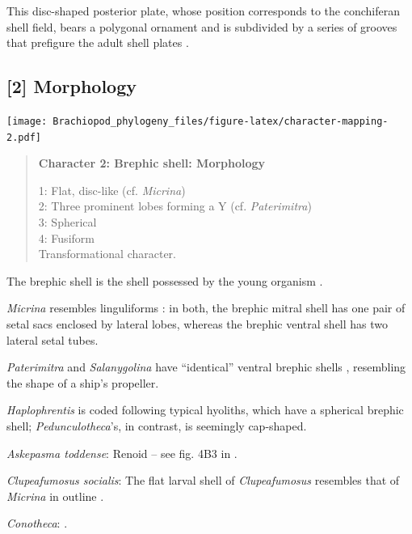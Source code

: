 \documentclass[openany]{book}
\begin{document}
This disc-shaped posterior plate, whose position corresponds to the
conchiferan shell field, bears a polygonal ornament and is subdivided by
a series of grooves that prefigure the adult shell plates
\citep{Wanninger2002C}.

\subsection*{{[}2{]} Morphology}\label{morphology}

\texttt{[image: Brachiopod\_phylogeny\_files/figure-latex/character-mapping-2.pdf]}

\begin{quote}
\textbf{Character 2: Brephic shell: Morphology}

1: Flat, disc-like (cf. \emph{Micrina})\\
2: Three prominent lobes forming a Y (cf. \emph{Paterimitra})\\
3: Spherical\\
4: Fusiform\\
Transformational character.
\end{quote}

The brephic shell is the shell possessed by the young organism
\citep[see][ and references therein for discussion of
terminology]{Ushatinskaya2016Revisionof}.

\emph{Micrina} resembles linguliforms \citep{Holmer2011Firstrecord}: in
both, the brephic mitral shell has one pair of setal sacs enclosed by
lateral lobes, whereas the brephic ventral shell has two lateral setal
tubes.

\emph{Paterimitra} and \emph{Salanygolina} have ``identical'' ventral
brephic shells \citep{Holmer2011Firstrecord}, resembling the shape of a
ship's propeller.

\emph{Haplophrentis} is coded following typical hyoliths, which have a
spherical brephic shell; \emph{Pedunculotheca}'s, in contrast, is
seemingly cap-shaped.

\hypertarget{Askepasma_toddense-coding-2}{}
\emph{Askepasma toddense}: Renoid -- see fig. 4B3 in
\citet{Topper2013Theoldest}.

\hypertarget{Clupeafumosus_socialis-coding-2}{}
\emph{Clupeafumosus socialis}: The flat larval shell of
\emph{Clupeafumosus} resembles that of \emph{Micrina} in outline
\citetext{\citealp{Topper2013Reappraisalof}; \citealp[cf.][]{Holmer2011Firstrecord}}.

\hypertarget{Conotheca-coding-2}{}
\emph{Conotheca}: \citep{Wrona2003}.
\end{document}
